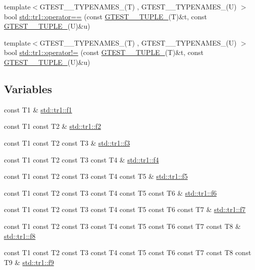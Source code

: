 \begin{DoxyCompactItemize}
\item 
{\footnotesize template$<$G\+T\+E\+S\+T\+\_\+\_\+\+T\+Y\+P\+E\+N\+A\+M\+E\+S\+\_\+(\+T) , G\+T\+E\+S\+T\+\_\+\_\+\+T\+Y\+P\+E\+N\+A\+M\+E\+S\+\_\+(\+U) $>$ }\\bool \hyperlink{namespacestd_1_1tr1_af4516de784404381f9b14797694b6311}{std\+::tr1\+::operator==} (const \hyperlink{gtest-tuple_8h_a275e7bcd84299cc44b9c1dba971951c4}{G\+T\+E\+S\+T\+\_\+\_\+\+T\+U\+P\+L\+E\+\_\+}(T)\&t, const \hyperlink{gtest-tuple_8h_a275e7bcd84299cc44b9c1dba971951c4}{G\+T\+E\+S\+T\+\_\+\_\+\+T\+U\+P\+L\+E\+\_\+}(U)\&u)
\item 
{\footnotesize template$<$G\+T\+E\+S\+T\+\_\+\_\+\+T\+Y\+P\+E\+N\+A\+M\+E\+S\+\_\+(\+T) , G\+T\+E\+S\+T\+\_\+\_\+\+T\+Y\+P\+E\+N\+A\+M\+E\+S\+\_\+(\+U) $>$ }\\bool \hyperlink{namespacestd_1_1tr1_a058882c51de469b5e78d29076f864940}{std\+::tr1\+::operator!=} (const \hyperlink{gtest-tuple_8h_a275e7bcd84299cc44b9c1dba971951c4}{G\+T\+E\+S\+T\+\_\+\_\+\+T\+U\+P\+L\+E\+\_\+}(T)\&t, const \hyperlink{gtest-tuple_8h_a275e7bcd84299cc44b9c1dba971951c4}{G\+T\+E\+S\+T\+\_\+\_\+\+T\+U\+P\+L\+E\+\_\+}(U)\&u)
\end{DoxyCompactItemize}
\subsection*{Variables}
\begin{DoxyCompactItemize}
\item 
const T1 \& \hyperlink{namespacestd_1_1tr1_a9c0fa65b105f8e2f58ba59ecf75fd000}{std\+::tr1\+::f1}
\item 
const T1 const T2 \& \hyperlink{namespacestd_1_1tr1_a87dd9e009868361317f587126dba63d4}{std\+::tr1\+::f2}
\item 
const T1 const T2 const T3 \& \hyperlink{namespacestd_1_1tr1_a0f7c3b47d27d42d82d1a333ea420ce4e}{std\+::tr1\+::f3}
\item 
const T1 const T2 const T3 const T4 \& \hyperlink{namespacestd_1_1tr1_adc796e02b7385d526aff708189564f67}{std\+::tr1\+::f4}
\item 
const T1 const T2 const T3 const T4 const T5 \& \hyperlink{namespacestd_1_1tr1_a9c1eb66b2b2fa321942af95405232a0d}{std\+::tr1\+::f5}
\item 
const T1 const T2 const T3 const T4 const T5 const T6 \& \hyperlink{namespacestd_1_1tr1_a6b62f32e1e3e21bceb94eb46c4cbfd56}{std\+::tr1\+::f6}
\item 
const T1 const T2 const T3 const T4 const T5 const T6 const T7 \& \hyperlink{namespacestd_1_1tr1_a2185f3a1c07f2df072c39cb91ffa89a4}{std\+::tr1\+::f7}
\item 
const T1 const T2 const T3 const T4 const T5 const T6 const T7 const T8 \& \hyperlink{namespacestd_1_1tr1_ab998afa41cea8d6d26d7e4288b0bf974}{std\+::tr1\+::f8}
\item 
const T1 const T2 const T3 const T4 const T5 const T6 const T7 const T8 const T9 \& \hyperlink{namespacestd_1_1tr1_a216d2c7cdfaaf415caba2f88e2c34413}{std\+::tr1\+::f9}
\end{DoxyCompactItemize}


